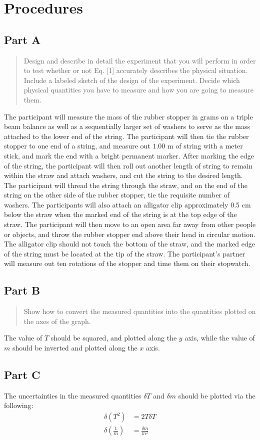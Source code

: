 \documentclass[8pt]{extarticle}
\begin{document}
{\section*{Procedures}
\subsection*{Part A}
\begin{quote}
	Design and describe in detail the experiment that you will perform in order to test whether or not Eq. [1] accurately describes the physical situation. Include a labeled sketch of the design of the experiment. Decide which physical quantities you have to measure and how you are going to measure them.
\end{quote}
The participant will measure the mass of the rubber stopper in grams on a triple beam balance as well as a sequentially larger set of washers to serve as the mass attached to the lower end of the string. The participant will then tie the rubber stopper to one end of a string, and measure out $1.00$ m of string with a meter stick, and mark the end with a bright permanent marker. After marking the edge of the string, the participant will then roll out another length of string to remain within the straw and attach washers, and cut the string to the desired length. The participant will thread the string through the straw, and on the end of the string on the other side of the rubber stopper, tie the requisite number of washers. The participants will also attach an alligator clip approximately 0.5 cm below the straw when the marked end of the string is at the top edge of the straw. The participant will then move to an open area far away from other people or objects, and throw the rubber stopper end above their head in circular motion. The alligator clip should not touch the bottom of the straw, and the marked edge of the string must be located at the tip of the straw. The participant's partner will measure out ten rotations of the stopper and time them on their stopwatch.
\subsection*{Part B}
\begin{quote}
	Show how to convert the measured quantities into the quantities plotted on the axes of the graph.
\end{quote}
The value of $T$ should be squared, and plotted along the $y$ axis, while the value of $m$ should be inverted and plotted along the $x$ axis.
\subsection*{Part C}
The uncertainties in the measured quantities $\delta T$ and $\delta m$ should be plotted via the following:
\begin{align*}
	\label{eq:}
	\delta \left(T^2\right) &= 2T\delta T \\
	\delta \left(\frac{1}{m}\right) &= \frac{\delta m}{m^2}
\end{align*}
}
\end{document}
